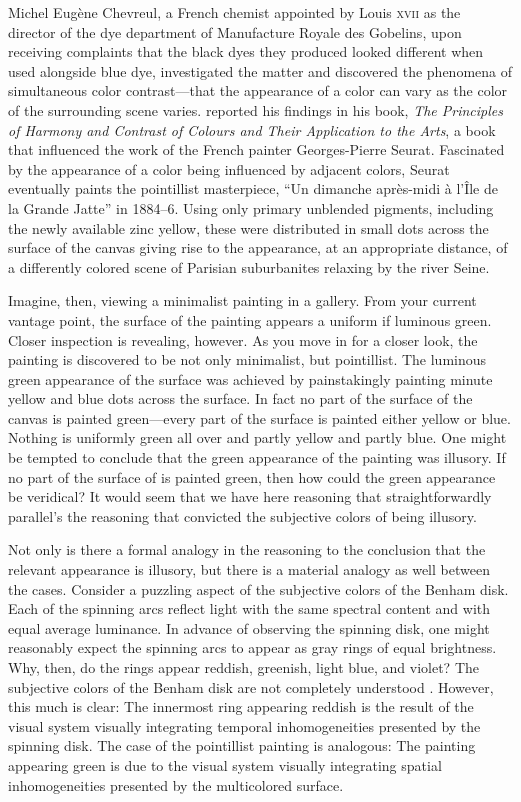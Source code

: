 \documentclass[12pt]{article}
\begin{document}
Michel Eugène Chevreul, a French chemist appointed by Louis \textsc{xvii} as the director of the dye department of Manufacture Royale des Gobelins, upon receiving complaints that the black dyes they produced looked different when used alongside blue dye, investigated the matter and discovered the phenomena of simultaneous color contrast---that the appearance of a color can vary as the color of the surrounding scene varies. \citet{Chevreul:1855kx} reported his findings in his book, \emph{The Principles of Harmony and Contrast of Colours and Their Application to the Arts}, a book that influenced the work of the French painter Georges-Pierre Seurat. Fascinated by the appearance of a color being influenced by adjacent colors, Seurat eventually paints the pointillist masterpiece, “Un dimanche après-midi à l'Île de la Grande Jatte” in 1884--6. Using only primary unblended pigments, including the newly available zinc yellow, these were distributed in small dots across the surface of the canvas giving rise to the appearance, at an appropriate distance, of a differently colored scene of Parisian suburbanites relaxing by the river Seine.

Imagine, then, viewing a minimalist painting in a gallery. From your current vantage point, the surface of the painting appears a uniform if luminous green. Closer inspection is revealing, however. As you move in for a closer look, the painting is discovered to be not only minimalist, but pointillist. The luminous green appearance of the surface was achieved by painstakingly painting minute yellow and blue dots across the surface. In fact no part of the surface of the canvas is painted green---every part of the surface is painted either yellow or blue. Nothing is uniformly green all over and partly yellow and partly blue. One might be tempted to conclude that the green appearance of the painting was illusory. If no part of the surface of is painted green, then how could the green appearance be veridical? It would seem that we have here reasoning that straightforwardly parallel's the reasoning that convicted the subjective colors of being illusory.

Not only is there a formal analogy in the reasoning to the conclusion that the relevant appearance is illusory, but there is a material analogy as well between the cases. Consider a puzzling aspect of the subjective colors of the Benham disk. Each of the spinning arcs reflect light with the same spectral content and with equal average luminance. In advance of observing the spinning disk, one might reasonably expect the spinning arcs to appear as gray rings of equal brightness. Why, then, do the rings appear reddish, greenish, light blue, and violet? The subjective colors of the Benham disk are not completely understood \citep[for a review of some of the color science see][]{Campenhausen:1995yq}. However, this much is clear: The innermost ring appearing reddish is the result of the visual system visually integrating temporal inhomogeneities presented by the spinning disk. The case of the pointillist painting is analogous: The painting appearing green is due to the visual system visually integrating spatial inhomogeneities presented by the multicolored surface. 
\end{document}

